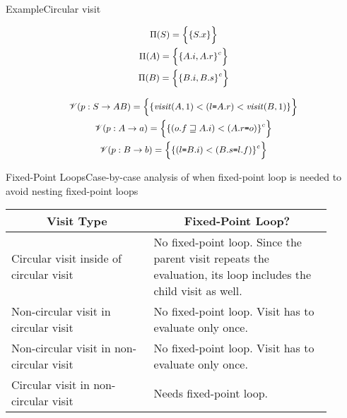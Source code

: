 

\begin{frame}{Example}{Circular visit}

\begin{equation}
\small
\begin{gathered}
\Pi(S) =  \Big \{   \{ S.x \}      \Big \} \\
\Pi(A) =  \Big \{   \{  A.i, A.r \}^c      \Big \} \\
\Pi(B) =  \Big \{   \{  B.i, B.s \}^c      \Big \}
\end{gathered}
\end{equation}

\begin{equation}
\small
\begin{gathered}
\mathscr{V}(p: S \rightarrow A B) = \Big \{  \{  \mathit{visit}(A, 1) <  (l \texttt{=} A.r) < \mathit{visit}(B, 1)  \}    \Big \} \\
\mathscr{V}(p: A \rightarrow a) = \Big \{  \{  (o.f \sqsupseteq A.i)  < (A.r \texttt{=} o)  \}^c    \Big \} \\
\mathscr{V}(p: B \rightarrow b) = \Big \{  \{  (l \texttt{=} B.i) < (B.s \texttt{=} l.f)  \}^c    \Big \}
\end{gathered}
\end{equation}

\end{frame}



\begin{frame}{Fixed-Point Loops}{Case-by-case analysis of when fixed-point loop is needed to avoid nesting fixed-point loops}

{ \small
\begin{tabular}{|p{0.4\linewidth} | p{0.5\linewidth}|}
\hline
\multicolumn{1}{|c|}{Visit Type} & \multicolumn{1}{c|}{Fixed-Point Loop?}   \\ 
\hline\hline
Circular visit inside of circular visit & No fixed-point loop. Since the parent visit repeats the evaluation, its loop includes the child visit as well.\\ \hline
Non-circular visit in circular visit & No fixed-point loop. Visit has to evaluate only once. \\ \hline
Non-circular visit in non-circular visit & No fixed-point loop. Visit has to evaluate only once. \\ \hline
Circular visit in non-circular visit & Needs fixed-point loop. \\ \hline
\end{tabular} }

\end{frame}

